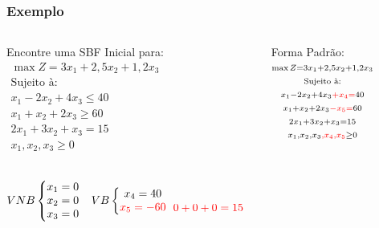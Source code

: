 \begin{frame}
	\frametitle{Exemplo}
	\begin{columns}
		\begin{column}{0.5\textwidth}
			\begin{block}{Encontre uma SBF Inicial para:}
				\centering
				$
					\begin{matrix}
						\scriptstyle \max Z = 3x_1 + 2,5x_2 + 1,2x_3 \\
						\scriptstyle \text{Sujeito à:}\\
						\scriptstyle x_1 -2x_2 + 4x_3 \le 40 \\
						\scriptstyle x_1 +x_2  + 2x_3 \ge 60 \\
						\scriptstyle 2x_1 +3x_2 + x_3 = 15 \\
						\scriptstyle x_1, x_2, x_3 \ge 0 \\
					\end{matrix}
				$
			\end{block}
		\end{column} \pause
		\begin{column}{0.5\textwidth}
			\begin{exampleblock}{Forma Padrão:}
				\centering
				$
					\begin{matrix}
						\scriptstyle \max Z = 3x_1 + 2,5x_2 + 1,2x_3 \\
						\scriptstyle \text{Sujeito à:}\\
						\scriptstyle x_1 -2x_2 + 4x_3 {\color{red}+x_4 =} 40 \\
						\scriptstyle x_1 +x_2  + 2x_3 {\color{red}-x_5=} 60 \\
						\scriptstyle 2x_1 +3x_2 + x_3 = 15 \\
						\scriptstyle x_1, x_2, x_3{\color{red},x_4,x_5} \ge 0 \\
					\end{matrix}
				$
			\end{exampleblock}
		\end{column} \pause
	\end{columns}

	\vspace{0.8cm}

	\begin{columns}
		\begin{column}{0.5\textwidth}
			$
				\begin{matrix}
					VNB \left\{
								\begin{matrix}
												x_1 = 0 \\
												x_2 = 0 \\
												x_3 = 0 \\
								\end{matrix} 
						\right. &
					VB \left\{
								\begin{matrix}
												x_4 = 40 \\
												{\color{red} x_5 = -60} \\
								\end{matrix} 
						\right. \\		
					 &  \\				
				\end{matrix}
			$
			$ {\color{red}0 + 0 + 0 = 15}  $
			

\end{column}
\end{columns}
\end{frame}
